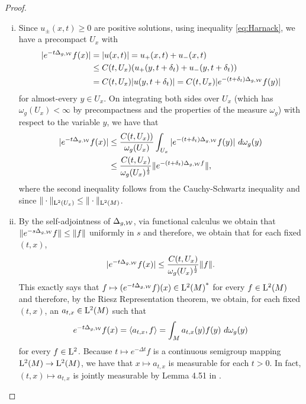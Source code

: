 \documentclass[a4paper, 12pt]{amsart}
\begin{document}
\begin{proof}
\begin{enumerate}[(i)]
\item  Since $u_{\pm}(x,t) \geq 0$ are positive solutions,
	using inequality \eqref{eq:Harnack}, we have a precompact $U_x$ 
	with 
	\begin{align*} 
	|e^{-t \Delta_{g,\mathcal{W}}}f(x)|  &= |u(x,t)| = u_+(x,t) + u_-(x,t) \\
		&\leq C(t,U_x) (u_+(y,t+\delta_t) + u_-(y,t+\delta_t)) \\
		&= C(t,U_x) |u(y,t + \delta_t)|
		= C(t,U_x)  |e^{-(t + \delta_t) \Delta_{g,\mathcal{W}}}f(y)|
	\end{align*} 
	for almost-every $y \in U_x$.
	On integrating both sides over $U_x$ (which has $\omega_g(U_x) < \infty$
	by precompactness and the properties of the measure $\omega_g$) with respect
	to the variable $y$,
	we have that
	\begin{align*} 
	|e^{-t \Delta_{g,\mathcal{W}}}f(x)| 
		&\leq \frac{C(t,U_x))}{\omega_g(U_x)} \int_{U_x} |e^{-(t + \delta_t) \Delta_{g,\mathcal{W}}}f(y)|\ d\omega_g(y) \\
		&\leq \frac{C(t,U_x)}{\omega_g(U_x)^{\frac{1}{2}}} \| e^{-(t + \delta_t) \Delta_{g,\mathcal{W}}f} \|,
	\end{align*}
	where the second inequality follows from the Cauchy-Schwartz
	inequality and since $\| \cdot \|_{{\rm L}^{2}_{\rm {}}(U_x)} \leq \| \cdot \|_{{\rm L}^{2}_{\rm {}}(M)}$.

\item By the self-adjointness of $\Delta_{g,\mathcal{W}}$, via functional calculus 
	we obtain that $\| e^{-s\Delta_{g,\mathcal{W}}}f \| \leq \| f \|$
	uniformly in $s$  and therefore, we obtain that for each fixed \((t, x)\),
	$$|e^{-t \Delta_{g,\mathcal{W}}}f(x)| \leq 
		\frac{C(t,U_x)}{\omega_g(U_x)^{\frac{1}{2}}} \| f \|.$$
	This exactly says that $f \mapsto (e^{-t\Delta_{g,\mathcal{W}}}f)(x) \in {{\rm L}^{2}_{\rm {}}(M)}^\ast$
	for every $f \in {\rm L}^{2}_{\rm {}}(M)$ and therefore, by the Riesz Representation theorem,
	we obtain, for each fixed \((t, x)\), an $a_{t,x} \in {\rm L}^{2}_{\rm {}}(M)$ such that
	$$ e^{-t \Delta_{g,\mathcal{W}}}f(x) = \langle a_{t,x},f \rangle = \int_{M} a_{t,x}(y)f(y)\ d\omega_g(y)$$
        for every \(f \in {\rm L}^{2}_{\rm {}}\). Because \(t \mapsto e^{-\Delta t} f\) is a continuous semigroup mapping 
	\({\rm L}^{2}_{\rm {}}(M) \to {\rm L}^{2}_{\rm {}}(M)\), we have that \(x \mapsto a_{t,x}\) is measurable for each $t > 0$.
	In fact, \((t, x) \mapsto a_{t,x}\) is jointly measurable by Lemma 4.51 in \cite{AB}.


\end{enumerate}
\end{proof}
\end{document}
